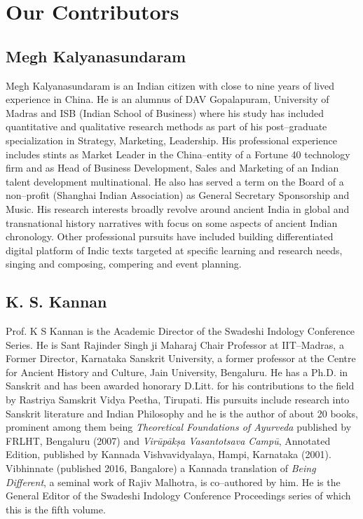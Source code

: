
\chapter{Our Contributors }\label{chapter10}

\section*{Megh Kalyanasundaram}

Megh Kalyanasundaram is an Indian citizen with close to nine years of lived experience in China. He is an alumnus of DAV Gopalapuram, University of Madras and ISB (Indian School of Business) where his study has included quantitative and qualitative research methods as part of his post–graduate specialization in Strategy, Marketing, Leadership. His professional experience includes stints as Market Leader in the China–entity of a Fortune 40 technology firm and as Head of Business Development, Sales and Marketing of an Indian talent development multinational. He also has served a term on the Board of a non–profit (Shanghai Indian Association) as General Secretary Sponsorship and Music. His research interests broadly revolve around ancient India in global and transnational history narratives with focus on some aspects of ancient Indian chronology. Other professional pursuits have included building differentiated digital platform of Indic texts targeted at specific learning and research needs, singing and composing, compering and event planning.


\section*{K. S. Kannan}

Prof. K S Kannan is the Academic Director of the Swadeshi Indology Conference Series. He is Sant Rajinder Singh ji Maharaj Chair Professor at IIT–Madras, a Former Director, Karnataka Sanskrit University, a former professor at the Centre for Ancient History and Culture, Jain University, Bengaluru. He has a Ph.D. in Sanskrit and has been awarded honorary D.Litt. for his contributions to the field by Rastriya Samskrit Vidya Peetha, Tirupati. His pursuits include research into Sanskrit literature and Indian Philosophy and he is the author of about 20 books, prominent among them being \textit{Theoretical Foundations of Ayurveda} published by FRLHT, Bengaluru (2007) and \textit{Virūpākṣa Vasantotsava Campū}, Annotated Edition, published by Kannada Vishvavidyalaya, Hampi, Karnataka (2001). Vibhinnate (published 2016, Bangalore) a Kannada translation of \textit{Being Different}, a seminal work of Rajiv Malhotra, is co–authored by him. He is the General Editor of the Swadeshi Indology Conference Proceedings series of which this is the fifth volume.


